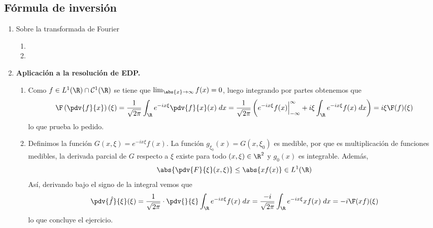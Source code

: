 \documentclass{article}
\begin{document}
\subsection{Fórmula de inversión}
\begin{enumerate}
    \item Sobre la transformada de Fourier
    \begin{enumerate}
        \item 
        
        \item 
    
    \end{enumerate}
    \item\textbf{Aplicación a la resolución de EDP.}
    \begin{enumerate}
        \item Como $f\in L^{1}(\R)\cap\mathcal{C}^{1}(\R)$ se tiene que 
        $\lim_{\abs{x}\to\infty}f(x)=0$, luego integrando por partes obtenemos que
        \begin{equation*}
            \F\left(\pdv{f}{x}\right)(\xi)
            =\frac{1}{\sqrt{2\pi}}\int_{\R}e^{-ix\xi}\pdv{f}{x}(x)\hspace{1mm}dx
            =\frac{1}{\sqrt{2\pi}}
            \left(e^{-ix\xi}f(x)\Big|_{-\infty}^{\infty}+i\xi\int_{\R}e^{-ix\xi}f(x)\hspace{1mm}dx
            \right)=i\xi\F(f)(\xi)
        \end{equation*}
        lo que prueba lo pedido.
        
        \item Definimos la función $G(x,\xi)=e^{-ix\xi}f(x)$. La función 
        $g_{\xi_{0}}(x)=G(x,\xi_{0})$ es medible, por que es multiplicación de funciones medibles,
        la derivada parcial de $G$ respecto a $\xi$ existe para todo $(x,\xi)\in\R^{2}$ y 
        $g_{0}(x)$ es integrable. Además,
        \begin{equation*}
            \abs{\pdv{F}{\xi}(x,\xi)}\leq\abs{xf(x)}\in L^{1}(\R)
        \end{equation*}
        Así, derivando bajo el signo de la integral vemos que
        \begin{equation*}
            \pdv{\hat{f}}{\xi}(\xi)
            =\frac{1}{\sqrt{2\pi}}\cdot\pdv{}{\xi}\int_{\R}e^{-ix\xi}f(x)\hspace{1mm}dx
            =\frac{-i}{\sqrt{2\pi}}\int_{\R}e^{-ix\xi}xf(x)\hspace{1mm}dx=-i\F(xf)(\xi)
        \end{equation*}
        lo que concluye el ejercicio.
    
    \end{enumerate}
\end{enumerate}
\end{document}
